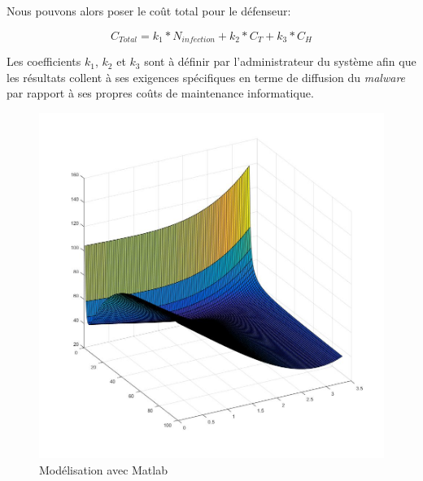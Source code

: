 Nous pouvons alors poser le coût total pour le défenseur:

\[
C_{Total}=k_1*N_{infection}+k_2*C_T+k_3*C_H
\]

Les coefficients $k_1$, $k_2$ et $k_3$ sont à définir par l'administrateur du système afin que les résultats collent à ses exigences spécifiques en terme de diffusion du \textit{malware} par rapport à ses propres coûts de maintenance informatique.

\begin{figure}[ht]
\centering
     \includegraphics[width=1.0\linewidth]{Paul/Matlab/3D.jpg}
     \caption{Modélisation avec Matlab}
     \label{normal_case}
\end{figure}

